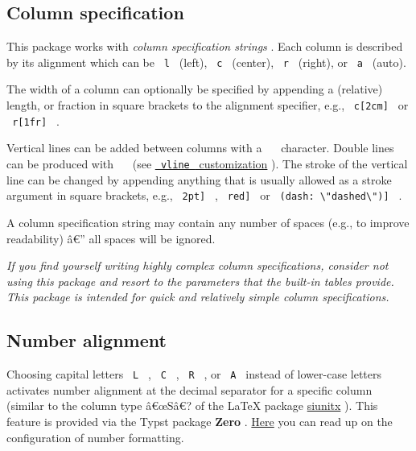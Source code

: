 \subsection{Column specification}\label{column-specification}

This package works with \emph{column specification strings} . Each
column is described by its alignment which can be \texttt{\ l\ } (left),
\texttt{\ c\ } (center), \texttt{\ r\ } (right), or \texttt{\ a\ }
(auto).

The width of a column can optionally be specified by appending a
(relative) length, or fraction in square brackets to the alignment
specifier, e.g., \texttt{\ c{[}2cm{]}\ } or \texttt{\ r{[}1fr{]}\ } .

Vertical lines can be added between columns with a
\texttt{\ \textbar{}\ } character. Double lines can be produced with
\texttt{\ \textbar{}\textbar{}\ } (see
\href{https://github.com/typst/packages/raw/main/packages/preview/pillar/0.2.0/\#vline-customization}{\texttt{\ vline\ }
customization} ). The stroke of the vertical line can be changed by
appending anything that is usually allowed as a stroke argument in
square brackets, e.g., \texttt{\ \textbar{}{[}2pt{]}\ } ,
\texttt{\ \textbar{}{[}red{]}\ } or
\texttt{\ \textbar{}{[}(dash:\ \textbackslash{}"dashed\textbackslash{}"){]}\ }
.

A column specification string may contain any number of spaces (e.g., to
improve readability) â€'' all spaces will be ignored.

\emph{If you find yourself writing highly complex column specifications,
consider not using this package and resort to the parameters that the
built-in tables provide. This package is intended for quick and
relatively simple column specifications.}

\subsection{Number alignment}\label{number-alignment}

Choosing capital letters \texttt{\ L\ } , \texttt{\ C\ } ,
\texttt{\ R\ } , or \texttt{\ A\ } instead of lower-case letters
activates number alignment at the decimal separator for a specific
column (similar to the column type â€œSâ€? of the LaTeX package
\href{https://github.com/josephwright/siunitx}{siunitx} ). This feature
is provided via the Typst package \textbf{Zero} .
\href{https://github.com/Mc-Zen/zero}{Here} you can read up on the
configuration of number formatting.

